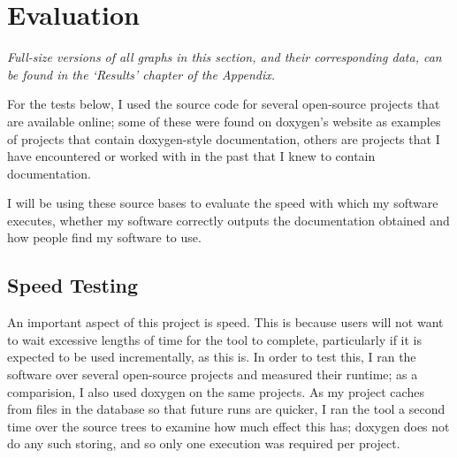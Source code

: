 



\chapter{Evaluation}
\emph{Full-size versions of all graphs in this section, and their corresponding
data, can be found in the `Results' chapter of the Appendix.}

For the tests below, I used the source code for several open-source projects
that are available online; some of these were found on doxygen's website as
examples of projects that contain doxygen-style documentation, others are
projects that I have encountered or worked with in the past that I knew to
contain documentation.

I will be using these source bases to evaluate the speed with which my software
executes, whether my software correctly outputs the documentation obtained and
how people find my software to use.

\section{Speed Testing}
An important aspect of this project is speed. This is because users will not
want to wait excessive lengths of time for the tool to complete, particularly if
it is expected to be used incrementally, as this is. In order to test this, I
ran the software over several open-source projects and measured their runtime;
as a comparision, I also used doxygen on the same projects. As my project caches
from files in the database so that future runs are quicker, I ran the tool a
second time over the source trees to examine how much effect this has; doxygen
does not do any such storing, and so only one execution was required per
project.


